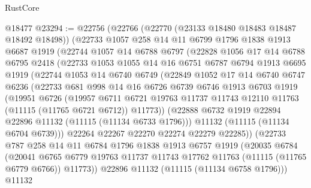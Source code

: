 \begin{lexlean}{RustCore}
\begin{coremodule}
    @18477
@23294 := @22756
    (@22766
      (@22770 (@23133 @18480 @18483 @18487 @18492 @18498))
      (@22733
        @1057
        @258
        @14
        @11
        @6799
        @1796
        @1838
        @1913
        @6687
        @1919
        (@22744
          @1057
          @14
          @6788
          @6797
          (@22828
            @1056
            @17
            @14
            @6788
            @6795
            @2418
            (@22733
              @1053
              @1055
              @14
              @16
              @6751
              @6787
              @6794
              @1913
              @6695
              @1919
              (@22744
                @1053
                @14
                @6740
                @6749
                (@22849
                  @1052
                  @17
                  @14
                  @6740
                  @6747
                  @6236
                  (@22733
                    @681
                    @998
                    @14
                    @16
                    @6726
                    @6739
                    @6746
                    @1913
                    @6703
                    @1919
                    (@19951
                      @6726
                      (@19957
                        @6711
                        @6721
                        @19763
                        @11737
                        @11743
                        @12110
                        @11763
                        (@11115 (@11765 @6721 @6712))
                        @11773))
                    (@22888 @6732 @1919 @22894 @22896 @11132 (@11115 (@11134 @6733 @1796)))
                    @11132
                    (@11115 (@11134 @6704 @6739)))
                  @22264
                  @22267
                  @22270
                  @22274
                  @22279
                  @22285))
              (@22733
                @787
                @258
                @14
                @11
                @6784
                @1796
                @1838
                @1913
                @6757
                @1919
                (@20035
                  @6784
                  (@20041
                    @6765
                    @6779
                    @19763
                    @11737
                    @11743
                    @17762
                    @11763
                    (@11115 (@11765 @6779 @6766))
                    @11773))
                @22896
                @11132
                (@11115 (@11134 @6758 @1796)))
              @11132

\end{coremodule}
\end{lexlean}
